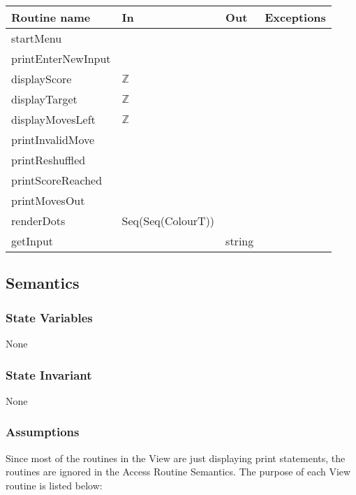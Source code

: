 \documentclass[12pt]{article}
\begin{document}
\begin{tabular}{| l | l | l | p{6cm} |}
\hline
\textbf{Routine name} & \textbf{In} & \textbf{Out} & \textbf{Exceptions}\\
\hline
startMenu & ~ & ~ & ~\\
\hline
printEnterNewInput & ~ & ~ & ~\\
\hline
displayScore & $\mathbb{Z}$ & ~ & ~\\
\hline
displayTarget & $\mathbb{Z}$ & ~ & ~\\
\hline
displayMovesLeft & $\mathbb{Z}$ & ~ & ~\\
\hline
printInvalidMove & ~ & ~ & ~\\
\hline
printReshuffled & ~ & ~ & ~ \\
\hline
printScoreReached & ~ & ~  & ~\\
\hline
printMovesOut & ~ & ~  & ~\\
\hline
renderDots & Seq(Seq(ColourT)) & ~  & ~\\
\hline
getInput & ~ & string & ~ \\
\hline
\end{tabular}

\subsection* {Semantics}

\subsubsection* {State Variables}
None

\subsubsection* {State Invariant}
None

\subsubsection* {Assumptions}
Since most of the routines in the View are just displaying print statements, the routines are ignored in the Access Routine Semantics. The purpose of each View routine is listed below: 
\end{document}
